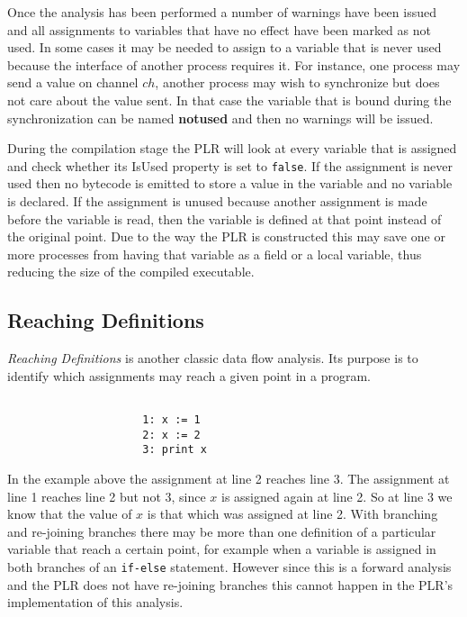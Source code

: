   Once the analysis has been performed a number of warnings have been issued and
  all assignments to variables that have no effect have been marked as not used.
  In some cases it may be needed to assign to a variable that is never used 
  because the interface of another process requires it. For instance, one process 
  may send a value on channel $ch$, another process may wish to synchronize but
  does not care about the value sent. In that case the variable that is bound 
  during the synchronization can be named \textbf{notused} and then no warnings
  will be issued.
  
  During the compilation stage the PLR will look at every variable that is 
  assigned and check whether its \textsf{IsUsed} property is set to 
  \texttt{false}. If the assignment is never used then no bytecode is emitted
  to store a value in the variable and no variable is declared. If the 
  assignment is unused because another assignment is made before the variable 
  is read, then the variable is defined at that point instead of the original 
  point. Due to the way the PLR is constructed this may save one or more
  processes from having that variable as a field or a local variable, thus
  reducing the size of the compiled executable.

\subsection{Reaching Definitions}\label{reaching_definitions}

  \textit{Reaching Definitions} is another classic data flow analysis. Its 
  purpose is to identify which assignments may reach a given point in a program.
  
\begin{Exa}
	\label{ex:reaching_definition}
	\begin{verbatim}
	
                     1: x := 1
                     2: x := 2
                     3: print x
	\end{verbatim}
\end{Exa}  
	
	In the example above the assignment at line 2 reaches line 3. The assignment at
	line 1 reaches line 2 but not 3, since $x$ is assigned again at line 2. So at
	line 3 we know that the value of $x$ is that which was assigned at line 2.
	With branching and re-joining branches there may be more than one definition
	of a particular variable that reach a certain point, for example when a variable
	is assigned in both branches of an \texttt{if-else} statement. However since
	this is a forward analysis and the PLR does not have re-joining branches this
	cannot happen in the PLR's implementation of this analysis. 
	
